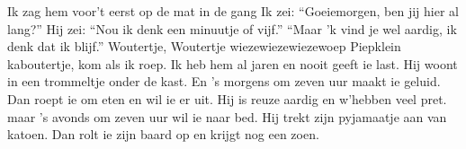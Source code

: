 \beginverse*
Ik zag hem voor’t eerst op de mat in de gang
Ik zei: “Goeiemorgen, ben jij hier al lang?”
Hij zei: “Nou ik denk een minuutje of vijf.”
“Maar ’k vind je wel aardig, ik denk dat ik blijf.”
\endverse
\beginchorus
Woutertje, Woutertje wiezewiezewiezewoep
Piepklein kaboutertje, kom als ik roep. 
\endchorus
\beginverse*
Ik heb hem al jaren en nooit geeft ie last.
Hij woont in een trommeltje onder de kast.
En 's morgens om zeven uur maakt ie geluid.
Dan roept ie om eten en wil ie er uit.
\endverse
\beginverse*
Hij is reuze aardig en w’hebben veel pret.
maar 's avonds om zeven uur wil ie naar bed.
Hij trekt zijn pyjamaatje aan van katoen.
Dan rolt ie zijn baard op en krijgt nog een zoen.
\endverse
\endsong